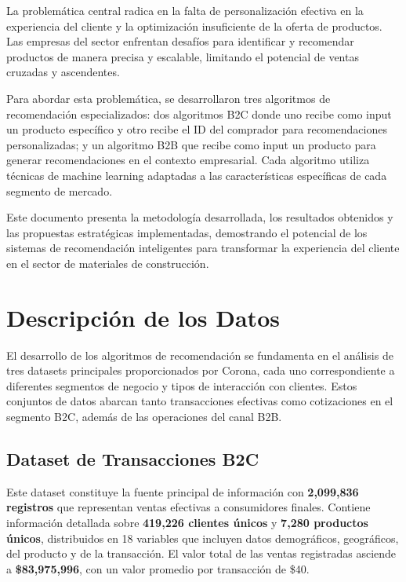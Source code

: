 \documentclass[twocolumn]{article}
\begin{document}
La problemática central radica en la falta de personalización efectiva en la experiencia del cliente y la optimización insuficiente de la oferta de productos. Las empresas del sector enfrentan desafíos para identificar y recomendar productos de manera precisa y escalable, limitando el potencial de ventas cruzadas y ascendentes.

Para abordar esta problemática, se desarrollaron tres algoritmos de recomendación especializados: dos algoritmos B2C donde uno recibe como input un producto específico y otro recibe el ID del comprador para recomendaciones personalizadas; y un algoritmo B2B que recibe como input un producto para generar recomendaciones en el contexto empresarial. Cada algoritmo utiliza técnicas de machine learning adaptadas a las características específicas de cada segmento de mercado.

Este documento presenta la metodología desarrollada, los resultados obtenidos y las propuestas estratégicas implementadas, demostrando el potencial de los sistemas de recomendación inteligentes para transformar la experiencia del cliente en el sector de materiales de construcción.

\section{Descripción de los Datos}

El desarrollo de los algoritmos de recomendación se fundamenta en el análisis de tres datasets principales proporcionados por Corona, cada uno correspondiente a diferentes segmentos de negocio y tipos de interacción con clientes. Estos conjuntos de datos abarcan tanto transacciones efectivas como cotizaciones en el segmento B2C, además de las operaciones del canal B2B.

\subsection{Dataset de Transacciones B2C}

Este dataset constituye la fuente principal de información con \textbf{2,099,836 registros} que representan ventas efectivas a consumidores finales. Contiene información detallada sobre \textbf{419,226 clientes únicos} y \textbf{7,280 productos únicos}, distribuidos en 18 variables que incluyen datos demográficos, geográficos, del producto y de la transacción. El valor total de las ventas registradas asciende a \textbf{\$83,975,996}, con un valor promedio por transacción de \$40.
\end{document}
